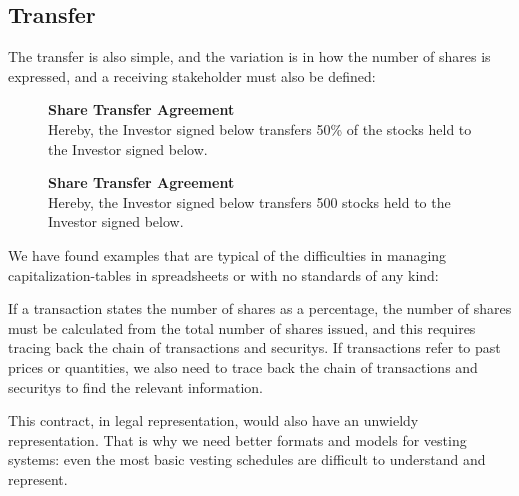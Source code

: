 \subsection{Transfer}

The transfer is also simple, and the variation is in how the number of shares is expressed, and a receiving \gls{stakeholder} must also be defined:

\begin{multicols}{2}
	\begin{figure}[H]\label{fig:doc-tt-transfer}
		\centering
		\begin{minipage}{0.4\textwidth}
			\textbf{Share Transfer Agreement}
			\\
			Hereby, the Investor signed below transfers 50\% of the stocks held to the Investor signed below.
		\end{minipage}
	\end{figure}
	\columnbreak{}
	\begin{figure}[H]\label{fig:doc-tt-transfer-2}
		\centering
		\begin{minipage}{0.4\textwidth}
			\textbf{Share Transfer Agreement}
			\\
			Hereby, the Investor signed below transfers 500 stocks held to the Investor signed below.
		\end{minipage}
	\end{figure}
\end{multicols}

We have found examples that are typical of the difficulties in managing \glspl{capitalization-table} in spreadsheets or with no standards of any kind:

If a transaction states the number of shares as a percentage, the number of shares must be calculated from the total number of shares issued, and this requires tracing back the chain of \glspl{transaction} and  \glspl{security}.  If \glspl{transaction} refer to past prices or quantities, we also need to trace back the chain of transactions and \glspl{security} to find the relevant information.

This contract, in legal representation, would also have an unwieldy representation. That is why we need better formats and models for vesting systems: even the most basic vesting schedules are difficult to understand and represent.

